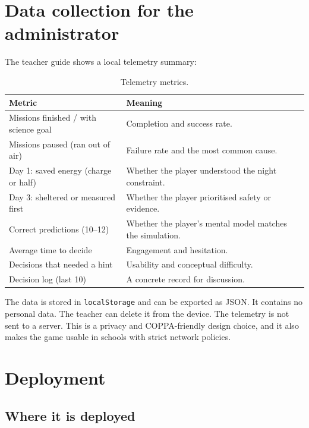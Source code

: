 \documentclass[11pt,a4paper]{article}
\newcommand{\code}[1]{\texttt{#1}}
\begin{document}
\section{Data collection for the administrator}

The teacher guide shows a local telemetry summary:

\begin{table}[H]
\centering
\small
\begin{tabular}{@{}p{5.4cm}p{9.0cm}@{}}
\toprule
\textbf{Metric} & \textbf{Meaning}\\
\midrule
Missions finished / with science goal & Completion and success rate.\\
Missions paused (ran out of air) & Failure rate and the most common cause.\\
Day 1: saved energy (charge or half) & Whether the player understood the night constraint.\\
Day 3: sheltered or measured first & Whether the player prioritised safety or evidence.\\
Correct predictions (10--12) & Whether the player's mental model matches the simulation.\\
Average time to decide & Engagement and hesitation.\\
Decisions that needed a hint & Usability and conceptual difficulty.\\
Decision log (last 10) & A concrete record for discussion.\\
\bottomrule
\end{tabular}
\caption{Telemetry metrics.}
\label{tab:telemetry}
\end{table}

The data is stored in \code{localStorage} and can be exported as JSON. It contains no personal data. The teacher can delete it from the device. The telemetry is not sent to a server. This is a privacy and COPPA-friendly design choice, and it also makes the game usable in schools with strict network policies.

\section{Deployment}

\subsection{Where it is deployed}
\end{document}
